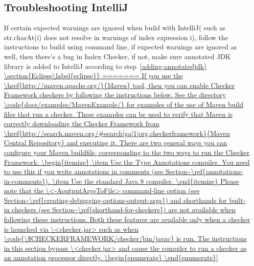 \subsection{Troubleshooting IntelliJ\label{intellij-troubleshooting}}
If certain expected warnings are ignored when build with IntelliJ( such as str.charAt(i)
does not resolve in warnings of index expression i), follow the instructions to build using command line,
if expected warnings are ignored as well, then there’s a bug in Index Checker, if not,
make sure annotated JDK library is added to IntelliJ according to step~\ref{adding-annotatedjdk)



\section{Eclipse\label{eclipse}}
=======
If you use the \href{http://maven.apache.org/}{Maven} tool,
then you can enable Checker Framework checkers by following the
instructions below.


See the directory \code{docs/examples/MavenExample/} for examples of the use of
Maven build files that run a checker.  These examples can be used to verify that
Maven is correctly downloading the Checker Framework from
\href{http://search.maven.org/#search|ga|1|org.checkerframework}{Maven
  Central Repository} and executing it.

There are two general ways you can configure your Maven buildfile,
corresponding to the two ways to run the Checker Framework:
\begin{itemize}
\item
  Use the Type Annotations compiler.  You need to use this if you write
  annotations in comments (see Section~\ref{annotations-in-comments}).
\item
  Use the standard Java 8 compiler.
\end{itemize}

Please note that the \<-AoutputArgsToFile> command-line option
(see Section~\ref{creating-debugging-options-output-args}) and shorthands for built-in checkers
(see Section~\ref{shorthand-for-checkers}) are not available when
following these instructions.  Both these features are available only when a checker is
launched via \<checker.jar> such as when \code{\$CHECKERFRAMEWORK/checker/bin/javac}
is run.  The instructions in this section
bypass \<checker.jar> and cause the compiler to run a
checker as an annotation processor directly.

\begin{enumerate}


\end{enumerate}}
